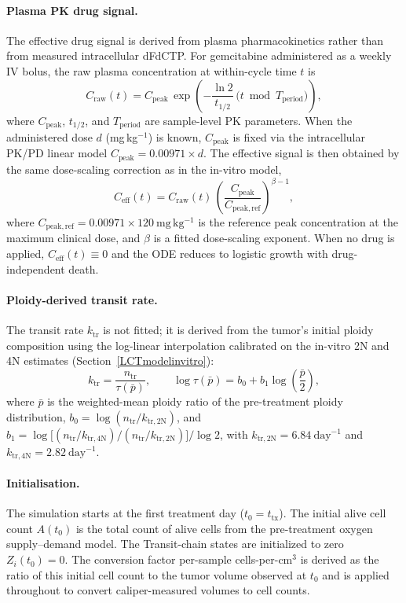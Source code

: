 \documentclass[11pt,notitlepage]{article}
\begin{document}
\paragraph{Plasma PK drug signal.}
The effective drug signal is derived from plasma pharmacokinetics rather than
from measured intracellular dFdCTP.
For gemcitabine administered as a weekly IV bolus, the raw plasma concentration
at within-cycle time $t$ is
\[
C_{\mathrm{raw}}(t)
=
C_{\mathrm{peak}}\,
\exp\!\left(-\frac{\ln 2}{t_{1/2}}\,\bigl(t \bmod T_{\mathrm{period}}\bigr)\right),
\]
where $C_{\mathrm{peak}}$, $t_{1/2}$, and $T_{\mathrm{period}}$ are sample-level
PK parameters.
When the administered dose $d$ (mg$\,$kg$^{-1}$) is known,
$C_{\mathrm{peak}}$ is fixed via the intracellular PK/PD linear model
$C_{\mathrm{peak}}=0.00971\times d$.
The effective signal is then obtained by the same dose-scaling correction
as in the in-vitro model,
\[
C_{\mathrm{eff}}(t)
=
C_{\mathrm{raw}}(t)\,
\left(\frac{C_{\mathrm{peak}}}{C_{\mathrm{peak,ref}}}\right)^{\!\beta-1},
\]
where $C_{\mathrm{peak,ref}}=0.00971\times120~\mathrm{mg\,kg^{-1}}$ is the
reference peak concentration at the maximum clinical dose, and $\beta$
is a fitted dose-scaling exponent.
When no drug is applied, $C_{\mathrm{eff}}(t)\equiv 0$ and the ODE reduces to logistic growth with drug-independent death.

\paragraph{Ploidy-derived transit rate.}
The transit rate $k_{\mathrm{tr}}$ is not fitted; it is derived from the
tumor's initial ploidy composition using the log-linear interpolation
calibrated on the in-vitro 2N and 4N estimates
(Section~\ref{LCTmodelinvitro}):
\[
k_{\mathrm{tr}}
=
\frac{n_{\mathrm{tr}}}{\tau(\bar{p})},
\qquad
\log\tau(\bar{p})
=
b_0 + b_1\log\!\left(\frac{\bar{p}}{2}\right),
\]
where $\bar{p}$ is the weighted-mean ploidy ratio of the pre-treatment
ploidy distribution, $b_0=\log(n_{\mathrm{tr}}/k_{\mathrm{tr,2N}})$,
and
$b_1=\log\!\bigl[(n_{\mathrm{tr}}/k_{\mathrm{tr,4N}})/(n_{\mathrm{tr}}/k_{\mathrm{tr,2N}})\bigr]/\log 2$,
with $k_{\mathrm{tr,2N}}=6.84~\mathrm{day}^{-1}$ and
$k_{\mathrm{tr,4N}}=2.82~\mathrm{day}^{-1}$.

\paragraph{Initialisation.}
The simulation starts at the first treatment day ($t_0=t_{\mathrm{tx}}$).
The initial alive cell count $A(t_0)$ is the total count of alive cells from the pre-treatment oxygen supply--demand model.
The Transit-chain states are initialized to zero $Z_i(t_0)=0$.
The conversion factor per-sample cells-per-cm$^3$ is derived as the
ratio of this initial cell count to the tumor volume observed at $t_0$
and is applied throughout to convert caliper-measured volumes to cell counts.
\end{document}
